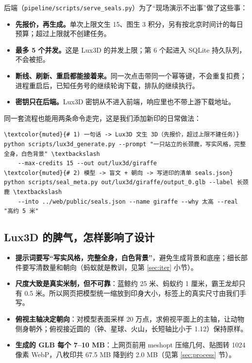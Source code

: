 \documentclass[UTF8,a4paper,zihao=5,fontset=none]{ctexart}
\begin{document}
后端（\texttt{pipeline/scripts/serve\_seals.py}）为了“现场演示不出事”做了这些事：
\begin{itemize}
  \item \textbf{先报价，再生成。}单次上限文生 15、图生 3 积分，另有按北京时间计的每日预算；超过上限就不创建任务。
  \item \textbf{最多 5 个并发。}这是 Lux3D 的并发上限；第 6 个起进入 SQLite 持久队列，不会被拒。
  \item \textbf{断线、刷新、重启都能接着来。}同一次点击带同一个幂等键，不会重复扣费；进程重启后，已知任务号的继续轮询下载，排队的继续执行。
  \item \textbf{密钥只在后端。}Lux3D 密钥从不进入前端，响应里也不带上游下载地址。
\end{itemize}

同一套流程也能用两条命令走完，这是我们添加新印的日常做法：
\begin{note}[colback=white]
\begin{Verbatim}[fontsize=\footnotesize,commandchars=\\\{\},formatcom=\xeCJKsetup{CJKecglue={\hspace{0pt}}}]
\textcolor{muted}{# 1) 一句话 -> Lux3D 文生 3D（先报价，超过上限不建任务）}
python scripts/lux3d_generate.py --prompt "一只站立的长颈鹿，写实风格，完整全身，白色背景" \textbackslash
    --max-credits 15 --out out/lux3d/giraffe
\textcolor{muted}{# 2) 模型 -> 盲文 + 朝向 -> 写进印的清单 seals.json}
python scripts/seal_meta.py out/lux3d/giraffe/output_0.glb --label 长颈鹿 \textbackslash
    --into ../web/public/seals.json --name giraffe --why 太高 --real "高约 5 米"
\end{Verbatim}
\end{note}

\subsection{Lux3D 的脾气，怎样影响了设计}
\begin{itemize}
  \item \textbf{提示词要写“写实风格，完整全身，白色背景”}，避免生成背景和底座；细长部件要写清数量和朝向（蚂蚁就是教训，见第 \ref{sec:iter} 小节）。
  \item \textbf{尺度大致是真实米制，但不可靠}：蓝鲸约 25 米、蚂蚁约 1 厘米，霸王龙却只有 0.5 米。所以网页把模型统一缩放到印身大小，标签上的真实尺寸由我们手写。
  \item \textbf{俯视主轴决定朝向}：对模型表面采样 20 万点，求俯视平面上的主轴，让动物侧身朝外；俯视接近圆的（钟、星球、火山，长短轴比小于 1.12）保持原样。
  \item \textbf{生成的 GLB 每个 7--10 MB}：上网页前用 meshopt 压缩几何、贴图转 1024 像素 WebP，八枚印共 67.5 MB 降到约 2.0 MB（见第 \ref{sec:process} 节）。
\end{itemize}
\end{document}
